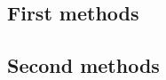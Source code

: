 \documentclass{article}
\begin{document}
\subsection*{First methods}

\lipsum[1-1]

\subsection*{Second methods}

\lipsum[1-1]

\end{document}
